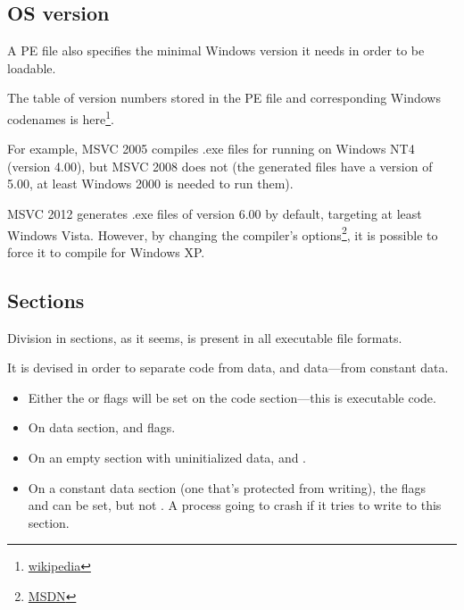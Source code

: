 \subsection{OS version}

A PE file also specifies the minimal Windows version it needs in order to be loadable.

The table of version numbers stored in the PE file and corresponding Windows codenames is
here\footnote{\href{http://go.yurichev.com/17044}{wikipedia}}.

For example, \ac{MSVC} 2005 compiles .exe files for running on Windows NT4 (version 4.00), but \ac{MSVC} 2008 does not 
(the generated files have a version of 5.00, at least Windows 2000 is needed to run them).


\ac{MSVC} 2012 generates .exe files of version 6.00 by default, 
targeting at least Windows Vista. 
However, by changing the compiler's options\footnote{\href{http://go.yurichev.com/17045}{MSDN}},
it is possible to force it to compile for Windows XP.

\subsection{Sections}

Division in sections, as it seems, is present in all executable file formats.

It is devised in order to separate code from data, and data---from constant data.

\begin{itemize}
\item Either the  or  flags will be set on the code section---this is executable code.

\item On data section\EMDASH{}, 
 and  flags.

\item On an empty section with uninitialized 
data\EMDASH{},  and .

\item On a constant data section (one that's protected from writing), the flags \\
 and  can be set, but not . 
A process going to crash if it tries to write to this section.
\end{itemize}

